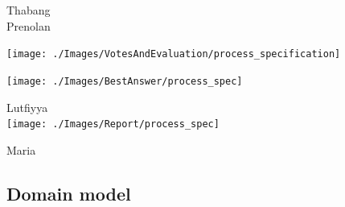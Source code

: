 \documentclass[a4paper,11pt]{article}
\begin{document}
Thabang\\
Prenolan\\
\begin{center}
\texttt{[image: ./Images/VotesAndEvaluation/process\_specification]}
\end{center}

\begin{center}
\texttt{[image: ./Images/BestAnswer/process\_spec]}
\end{center}

Lutfiyya\\
\texttt{[image: ./Images/Report/process\_spec]}

Maria\\

\subsection{Domain model}
\end{document}
